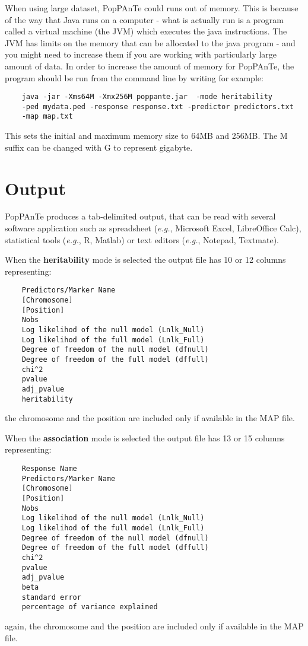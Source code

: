 \documentclass[a4paper,9pt]{article}
\begin{document}
\noindent
When using large dataset, PopPAnTe could runs out of memory. This is because of the way that Java runs on a computer - what is actually run is a program called a virtual machine (the JVM) which executes the java instructions. The JVM has limits on the memory that can be allocated to the java program - and you might need to increase them if you are working with particularly large amount of data. In order to increase the amount of memory for PopPAnTe, the program should be run from the command line by writing for example:

\begin{Verbatim}
	java -jar -Xms64M -Xmx256M poppante.jar  -mode heritability
	-ped mydata.ped -response response.txt -predictor predictors.txt
	-map map.txt
\end{Verbatim}

\noindent
This sets the initial and maximum memory size to 64MB and 256MB. The M suffix can be changed with G to represent gigabyte.






\section{Output}
PopPAnTe produces a tab-delimited output, that can be read with several software application such as spreadsheet (\emph{e.g.}, Microsoft Excel, LibreOffice Calc), statistical tools (\emph{e.g.}, R, Matlab) or text editors (\emph{e.g.}, Notepad, Textmate). 

\noindent
When the \textbf{heritability} mode is selected the output file has 10 or 12 columns representing:

\begin{Verbatim}
	Predictors/Marker Name
	[Chromosome]
	[Position]
	Nobs
	Log likelihod of the null model (Lnlk_Null)
	Log likelihod of the full model (Lnlk_Full)
	Degree of freedom of the null model (dfnull)
	Degree of freedom of the full model (dffull)
	chi^2
	pvalue
	adj_pvalue
	heritability
\end{Verbatim}
%
the chromosome and the position are included only if available in the MAP file.

\noindent
When the \textbf{association} mode is selected the output file has 13 or 15 columns representing:

\begin{Verbatim}
	Response Name
	Predictors/Marker Name
	[Chromosome]
	[Position]
	Nobs
	Log likelihod of the null model (Lnlk_Null)
	Log likelihod of the full model (Lnlk_Full)
	Degree of freedom of the null model (dfnull)
	Degree of freedom of the full model (dffull)
	chi^2
	pvalue
	adj_pvalue
	beta
	standard error
	percentage of variance explained
\end{Verbatim}
%
again, the chromosome and the position are included only if available in the MAP file.
\end{document}
